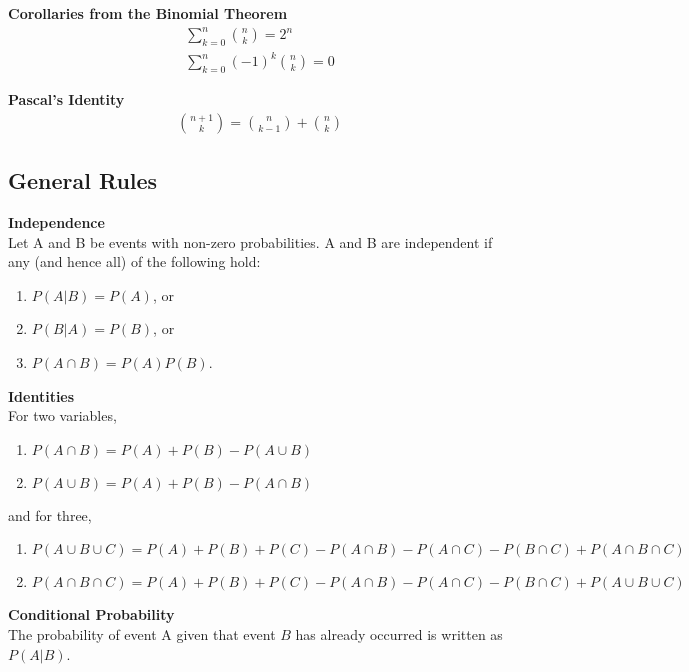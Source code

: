 \documentclass{article}
\numberwithin{theorem}{subsection}
\numberwithin{theorem}{subsubsection}
\theoremstyle{definition}
\numberwithin{definition}{subsection}
\numberwithin{definition}{subsubsection}
\begin{document}
\noindent \textbf{Corollaries from the Binomial Theorem} \\
\begin{gather*}
    \sum_{k=0}^{n} {n\choose k} = 2^{n} \\
    \sum_{k=0}^{n} (-1)^{k} {n\choose k} = 0
\end{gather*}

\noindent \textbf{Pascal's Identity} \\
\begin{gather*}
    {n+1 \choose k} = {n \choose k-1} + {n\choose k}
\end{gather*}


\subsection{General Rules}

\noindent \textbf{Independence} \\
\indent Let A and B be events with non-zero probabilities. A and B are independent if any (and hence all) of the following hold:
\begin{enumerate}
    \item $P(A|B) = P(A)$, or
    \item $P(B|A) = P(B)$, or
    \item $P(A \cap B) = P(A)P(B)$.
\end{enumerate}

\noindent \textbf{Identities} \\
\indent For two variables,

\begin{enumerate}
    \item $P(A \cap B) = P(A) + P(B) - P(A \cup B)$
    \item $P(A \cup B) = P(A) + P(B) - P(A \cap B)$
\end{enumerate}

and for three,

\begin{enumerate}
    \item $P(A \cup B \cup C) = P(A) + P(B) + P(C) - P(A \cap B) - P(A \cap C) - P(B \cap C) + P(A \cap B \cap C)$
    \item $P(A \cap B \cap C) = P(A) + P(B) + P(C) - P(A \cap B) - P(A \cap C) - P(B \cap C) + P(A \cup B \cup C)$
\end{enumerate}

\noindent \textbf{Conditional Probability} \\
\indent The probability of event A given that event $B$ has already occurred is written as $P(A|B)$.
\end{document}
